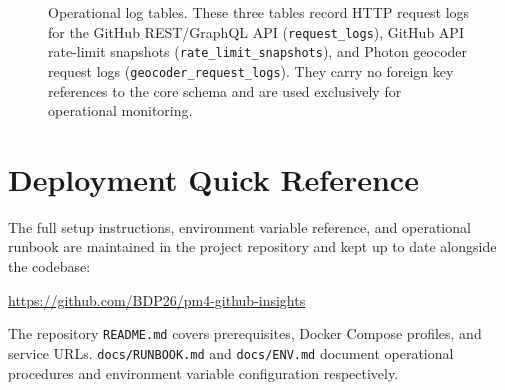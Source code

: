 \documentclass[sigconf]{acmart}
\begin{document}
\begin{figure}[t]
{{\begin{tikzpicture}[x=1cm, y=1cm]

\end{tikzpicture}%
}}
\caption{Operational log tables. These three tables record HTTP request logs
  for the GitHub REST/GraphQL API (\texttt{request\_logs}), GitHub API rate-limit
  snapshots (\texttt{rate\_limit\_snapshots}), and Photon geocoder request logs
  (\texttt{geocoder\_request\_logs}). They carry no foreign key references to
  the core schema and are used exclusively for operational monitoring.}
\label{fig:db-operational}
\end{figure}

\clearpage
\section{Deployment Quick Reference}

The full setup instructions, environment variable reference, and operational
runbook are maintained in the project repository and kept up to date alongside
the codebase:

\begin{center}
  \url{https://github.com/BDP26/pm4-github-insights}
\end{center}

The repository \texttt{README.md} covers prerequisites, Docker Compose
profiles, and service URLs. \texttt{docs/RUNBOOK.md} and \texttt{docs/ENV.md}
document operational procedures and environment variable configuration
respectively.
\end{document}
